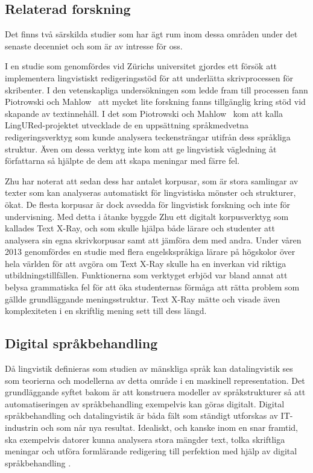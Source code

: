 \documentclass[swedish]{maucsthesis}
\begin{document}
\subsection{Relaterad forskning}\label{relateradforskning}

Det finns två särskilda studier som har ägt rum inom dessa områden under det
senaste decenniet och som är av intresse för oss.

I en studie som genomfördes vid Zürichs universitet gjordes ett försök att
implementera lingvistiskt redigeringsstöd för att underlätta skrivprocessen för
skribenter. I den vetenskapliga undersökningen som ledde fram till processen
fann Piotrowski och Mahlow~\cite{Piotrowski:2009} att mycket lite forskning fanns tillgänglig kring stöd vid skapande av textinnehåll. I det som Piotrowski och Mahlow~\cite{Piotrowski:2009} kom att
kalla LingURed-projektet utvecklade de en uppsättning språkmedvetna
redigeringsverktyg som kunde analysera teckensträngar utifrån dess språkliga
struktur. Även om dessa verktyg inte kom att ge lingvistisk vägledning åt
författarna så hjälpte de dem att skapa meningar med färre fel.

Zhu\cite{zhu:2015} har noterat att sedan dess har antalet korpusar, som är stora
samlingar av texter som kan analyseras automatiskt för lingvistiska mönster och
strukturer, ökat. De flesta korpusar är dock avsedda för lingvistisk forskning och
inte för undervisning. Med detta i åtanke byggde Zhu \cite{zhu:2015} ett
digitalt korpusverktyg som kallades Text X-Ray, och som skulle hjälpa både lärare och
studenter att analysera sin egna skrivkorpusar samt att jämföra dem med andra.
Under våren 2013 genomfördes en studie med flera engelskspråkiga lärare på
högskolor över hela världen för att avgöra om Text X-Ray skulle ha en inverkan
vid riktiga utbildningstillfällen. Funktionerna som verktyget erbjöd var bland
annat att belysa grammatiska fel för att öka studenternas förmåga att rätta problem
som gällde grundläggande meningsstruktur. Text X-Ray mätte och visade även
komplexiteten i en skriftlig mening sett till dess längd.

\subsection{Digital språkbehandling}\label{språkteknologi}

Då lingvistik definieras som studien av mänskliga språk kan datalingvistik ses som teorierna och modellerna av detta område i en maskinell representation. Det
grundläggande syftet bakom är att konstruera modeller av
språkstrukturer så att automatiseringen av språkbehandling exempelvis kan göras
digitalt. Digital språkbehandling och datalingvistik är båda fält som ständigt utforskas
av IT-industrin och som når nya resultat. Idealiskt, och kanske inom en snar
framtid, ska exempelvis datorer kunna analysera stora mängder text, tolka
skriftliga meningar och utföra formlärande redigering till perfektion med hjälp
av digital språkbehandling \cite{nugues:2014}.
\end{document}
